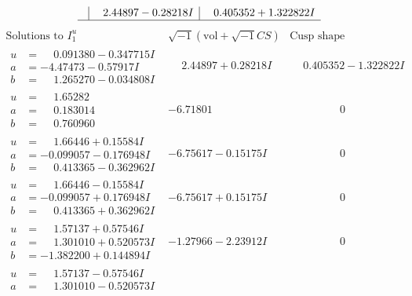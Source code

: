 \documentclass[1p]{elsarticle_modified}
\theoremstyle{definition}
\newcommand{\I}{\sqrt{-1}}
\begin{document}
$$\begin{array}{c|c|c}
 & \phantom{-}2.44897 - 0.28218 I & \phantom{-}0.405352 + 1.322822 I\\
 \hline 
 \end{array}$$\newpage$$\begin{array}{c|c|c}  
\text{Solutions to }I^u_{1}& \I (\text{vol} + \sqrt{-1}CS) & \text{Cusp shape}\\
 \hline 
\begin{aligned}
u &= \phantom{-}0.091380 - 0.347715 I \\
a &= -4.47473 - 0.57917 I \\
b &= \phantom{-}1.265270 - 0.034808 I\end{aligned}
 & \phantom{-}2.44897 + 0.28218 I & \phantom{-}0.405352 - 1.322822 I \\ \hline\begin{aligned}
u &= \phantom{-}1.65282\phantom{ +0.000000I} \\
a &= \phantom{-}0.183014\phantom{ +0.000000I} \\
b &= \phantom{-}0.760960\phantom{ +0.000000I}\end{aligned}
 & -6.71801\phantom{ +0.000000I} & \phantom{-0.000000 } 0 \\ \hline\begin{aligned}
u &= \phantom{-}1.66446 + 0.15584 I \\
a &= -0.099057 - 0.176948 I \\
b &= \phantom{-}0.413365 - 0.362962 I\end{aligned}
 & -6.75617 - 0.15175 I & \phantom{-0.000000 } 0 \\ \hline\begin{aligned}
u &= \phantom{-}1.66446 - 0.15584 I \\
a &= -0.099057 + 0.176948 I \\
b &= \phantom{-}0.413365 + 0.362962 I\end{aligned}
 & -6.75617 + 0.15175 I & \phantom{-0.000000 } 0 \\ \hline\begin{aligned}
u &= \phantom{-}1.57137 + 0.57546 I \\
a &= \phantom{-}1.301010 + 0.520573 I \\
b &= -1.382200 + 0.144894 I\end{aligned}
 & -1.27966 - 2.23912 I & \phantom{-0.000000 } 0 \\ \hline\begin{aligned}
u &= \phantom{-}1.57137 - 0.57546 I \\
a &= \phantom{-}1.301010 - 0.520573 I \\

\end{aligned}
\end{array}$$
\end{document}
